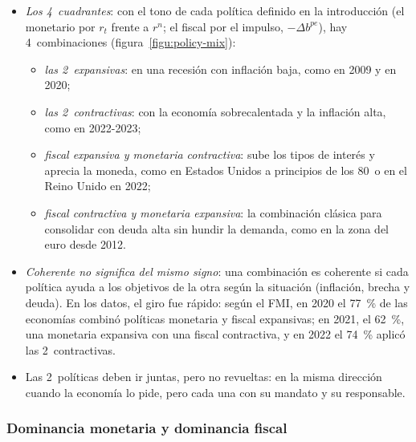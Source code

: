 \documentclass[11pt]{article}
\begin{document}
\begin{itemize}
\item \emph{Los 4~cuadrantes}: con el tono de cada política definido en la introducción (el monetario por $r_t$ frente a $r^n$; el fiscal por el impulso, $-\Delta b^{pe}$), hay 4~combinaciones (figura~\ref{figu:policy-mix}):
  \begin{itemize}
  \item \emph{las 2~expansivas}: en una recesión con inflación baja, como en 2009 y en 2020;
  \item \emph{las 2~contractivas}: con la economía sobrecalentada y la inflación alta, como en 2022-2023;
  \item \emph{fiscal expansiva y monetaria contractiva}: sube los tipos de interés y aprecia la moneda, como en Estados Unidos a principios de los 80~o en el Reino Unido en 2022;
  \item \emph{fiscal contractiva y monetaria expansiva}: la combinación clásica para consolidar con deuda alta sin hundir la demanda, como en la zona del euro desde 2012.
  \end{itemize}
\item \emph{Coherente no significa del mismo signo}: una combinación es coherente si cada política ayuda a los objetivos de la otra según la situación (inflación, brecha y deuda). En los datos, el giro fue rápido: según el FMI, en 2020 el 77~\% de las economías combinó políticas monetaria y fiscal expansivas; en 2021, el 62~\%, una monetaria expansiva con una fiscal contractiva, y en 2022 el 74~\% aplicó las 2~contractivas\nocite{FMI2023FiscalMonitor}.
\item Las 2~políticas deben ir juntas, pero no revueltas: en la misma dirección cuando la economía lo pide, pero cada una con su mandato y su responsable.
\end{itemize}

\begin{infografia}[H]
\centering
\caption{La combinación de políticas (\emph{policy mix}): los 4~cuadrantes}\label{figu:policy-mix}
\end{infografia}

\subsubsection{Dominancia monetaria y dominancia fiscal}\label{sec:dominacion}
\end{document}
